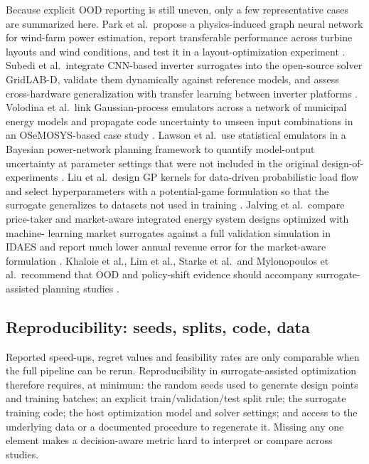 Because explicit OOD reporting is still uneven, only a few
representative cases are summarized here. Park et al.\ propose a
physics-induced graph neural network for wind-farm power estimation,
report transferable performance across turbine layouts and wind
conditions, and test it in a layout-optimization experiment
\cite{Park2019}. Subedi et al.\ integrate CNN-based inverter
surrogates into the open-source solver GridLAB-D, validate them
dynamically against reference models, and assess cross-hardware
generalization with transfer learning between inverter platforms
\cite{Subedi2026157}. Volodina et al.\ link Gaussian-process
emulators across a network of municipal energy models and propagate
code uncertainty to unseen input combinations in an OSeMOSYS-based
case study \cite{Volodina2022}. Lawson et al.\ use statistical
emulators in a Bayesian power-network planning framework to quantify
model-output uncertainty at parameter settings that were not included
in the original design-of-experiments \cite{Lawson201647}. Liu
et al.\ design GP kernels for data-driven probabilistic load flow and
select hyperparameters with a potential-game formulation so that the
surrogate generalizes to datasets not used in training
\cite{Liu20222679}. Jalving et al.\ compare price-taker and
market-aware integrated energy system designs optimized with machine-
learning market surrogates against a full validation simulation in
IDAES and report much lower annual revenue error for the market-aware
formulation \cite{Jalving2023}. Khaloie et al., Lim et al., Starke
et al.\ and Mylonopoulos et al.\ recommend that OOD and policy-shift
evidence should accompany surrogate-assisted planning studies
\cite{Khaloie2025,Lim2025,Starke2025214,Mylonopoulos202332697}.

\subsection{Reproducibility: seeds, splits, code, data}
\label{sec:val:repro}

Reported speed-ups, regret values and feasibility rates are only
comparable when the full pipeline can be rerun. Reproducibility in
surrogate-assisted optimization therefore requires, at minimum: the
random seeds used to generate design points and training batches; an
explicit train/validation/test split rule; the surrogate training code;
the host optimization model and solver settings; and access to the
underlying data or a documented procedure to regenerate it. Missing
any one element makes a decision-aware metric hard to interpret or
compare across studies.

